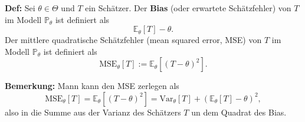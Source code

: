 \documentclass[a4paper]{extarticle}
\begin{document}
\textbf{Def:} Sei $\theta \in \Theta$ und $T$ ein Schätzer. Der \textbf{Bias} (oder erwartete Schätzfehler) von $T$ im Modell $\mathbb{P}_{\theta}$ ist definiert als
\[
    \mathbb{E}_{\theta}[T] - \theta.
\]
Der mittlere quadratische Schätzfehler (mean squared error, MSE) von $T$ im Modell $\mathbb{P}_{\theta}$ ist definiert als
\[
    \text{MSE}_{\theta}[T] := \mathbb{E}_{\theta}[(T - \theta)^2].
\]

\textbf{Bemerkung:} Mann kann den MSE zerlegen als
\[
    \text{MSE}_{\theta}[T] = \mathbb{E}_{\theta}[(T - \theta)^2] = \text{Var}_{\theta}[T] + (\mathbb{E}_{\theta}[T] - \theta)^2,
\]
also in die Summe aus der Varianz des Schätzers $T$ un dem Quadrat des Bias.
\end{document}
